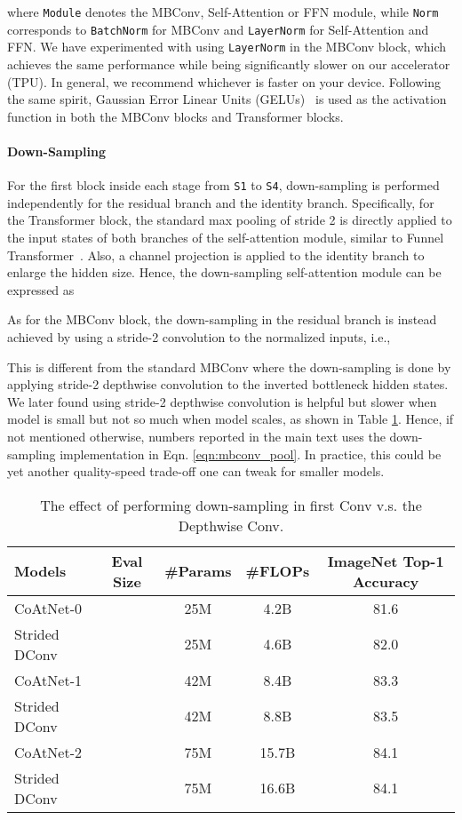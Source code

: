 \documentclass{article}
\newcommand{\name}{CoAtNet\xspace}
\begin{document}
where \texttt{Module} denotes the MBConv, Self-Attention or FFN module, while \texttt{Norm} corresponds to \texttt{BatchNorm} for MBConv and \texttt{LayerNorm} for Self-Attention and FFN.
We have experimented with using \texttt{LayerNorm} in the MBConv block, which achieves the same performance while being significantly slower on our accelerator (TPU).
In general, we recommend whichever is faster on your device.
Following the same spirit, Gaussian Error Linear Units (GELUs)~\cite{hendrycks2016gaussian} is used as the activation function in both the MBConv blocks and Transformer blocks.

\paragraph{Down-Sampling} For the first block inside each stage from \texttt{S1} to \texttt{S4}, down-sampling is performed independently for the residual branch and the identity branch.
Specifically, for the Transformer block, the standard max pooling of stride 2 is directly applied to the input states of both branches of the self-attention module, similar to Funnel Transformer~\cite{dai2020funnel}.
Also, a channel projection is applied to the identity branch to enlarge the hidden size.
Hence, the down-sampling self-attention module can be expressed as

As for the MBConv block, the down-sampling in the residual branch is instead achieved 
by using a stride-2 convolution to the normalized inputs, i.e.,

This is different from the standard MBConv where the down-sampling is done by applying stride-2 depthwise convolution to the inverted bottleneck hidden states.
We later found using stride-2 depthwise convolution is helpful but slower when model is small but not so much when model scales, as shown in Table \ref{tab:correction}.
Hence, if not mentioned otherwise, numbers reported in the main text uses the down-sampling implementation in Eqn. \eqref{eqn:mbconv_pool}.
In practice, this could be yet another quality-speed trade-off one can tweak for smaller models.
\begin{table}[!ht]
\small
    \centering
    \caption{The effect of performing down-sampling in first Conv v.s. the Depthwise Conv.}
    \begin{tabular}{l c c c c}
        \toprule
        \bf Models & \bf Eval Size & \bf \#Params & \bf \#FLOPs & \bf ImageNet Top-1 Accuracy \\
        \midrule
        \name-0             &  & 25M & 4.2B & 81.6 \\
        \quad Strided DConv &  & 25M & 4.6B & 82.0 \\
        \name-1             &  & 42M & 8.4B & 83.3 \\
        \quad Strided DConv &  & 42M & 8.8B & 83.5 \\
        \name-2             &  & 75M & 15.7B & 84.1 \\
        \quad Strided DConv &  & 75M & 16.6B & 84.1  \\
        \bottomrule
    \end{tabular}
    \label{tab:correction}
\end{table}
\end{document}

